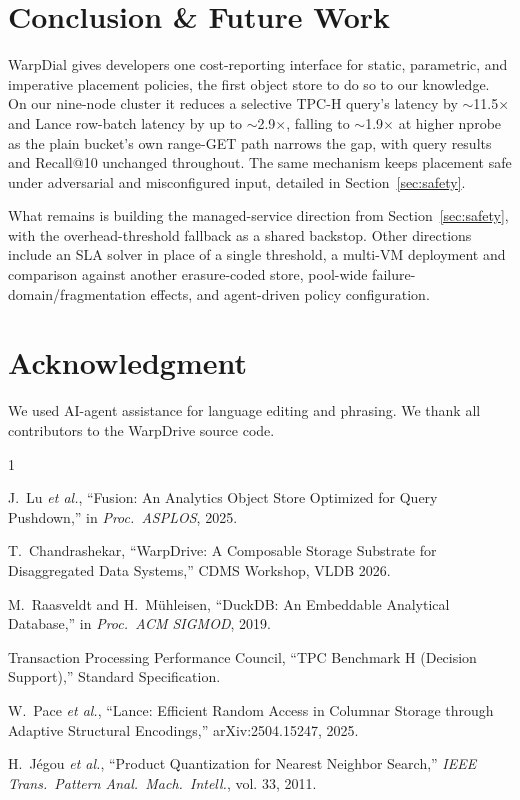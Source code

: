 \documentclass[10pt,conference]{IEEEtran}
\begin{document}
\section{Conclusion \& Future Work}

WarpDial gives developers one cost-reporting interface for static,
parametric, and imperative placement policies, the first object store
to do so to our knowledge. On our nine-node cluster it reduces a
selective TPC-H query's latency by $\sim$11.5$\times$ and Lance
row-batch latency by up to $\sim$2.9$\times$, falling to
$\sim$1.9$\times$ at higher nprobe as the plain bucket's own range-GET
path narrows the gap, with query results and Recall@10 unchanged
throughout. The same mechanism keeps placement safe under adversarial
and misconfigured input, detailed in Section~\ref{sec:safety}.

What remains is building the managed-service direction from
Section~\ref{sec:safety}, with the overhead-threshold fallback as a
shared backstop. Other directions include an SLA solver in place of a
single threshold, a multi-VM deployment and comparison against another
erasure-coded store, pool-wide failure-domain/fragmentation effects,
and agent-driven policy configuration.

{\footnotesize\section*{Acknowledgment}
We used AI-agent assistance for language editing and phrasing. We thank all contributors to the WarpDrive source code.
}

{\scriptsize{}
\begin{thebibliography}{1}
\setlength{\itemsep}{0pt}
\setlength{\parskip}{0pt}

J.~Lu \textit{et al.}, ``Fusion: An Analytics Object Store Optimized for
Query Pushdown,'' in \emph{Proc.\ ASPLOS}, 2025.

T.~Chandrashekar, ``WarpDrive: A Composable Storage Substrate for
Disaggregated Data Systems,'' CDMS Workshop, VLDB 2026.

M.~Raasveldt and H.~M{\"u}hleisen, ``DuckDB: An Embeddable Analytical
Database,'' in \emph{Proc.\ ACM SIGMOD}, 2019.

Transaction Processing Performance Council, ``TPC Benchmark H (Decision
Support),'' Standard Specification.

W.~Pace \textit{et al.}, ``Lance: Efficient Random Access in Columnar
Storage through Adaptive Structural Encodings,'' arXiv:2504.15247, 2025.

H.~J{\'e}gou \textit{et al.}, ``Product Quantization for Nearest Neighbor
Search,'' \emph{IEEE Trans.\ Pattern Anal.\ Mach.\ Intell.}, vol. 33, 2011.

\end{thebibliography}
}
\end{document}

